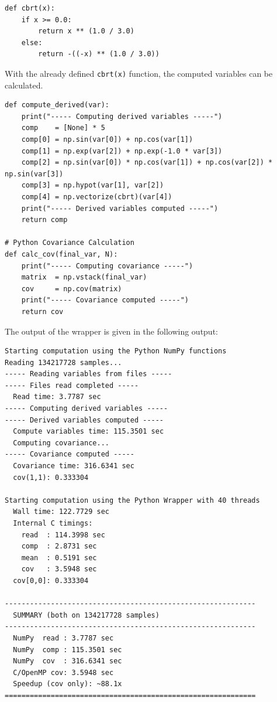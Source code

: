 \begin{verbatim}
def cbrt(x):
    if x >= 0.0:
        return x ** (1.0 / 3.0)
    else:
        return -((-x) ** (1.0 / 3.0))
\end{verbatim}

With the already defined \texttt{cbrt(x)} function, the computed variables can be calculated.

\begin{verbatim}
def compute_derived(var):
    print("----- Computing derived variables -----")
    comp    = [None] * 5
    comp[0] = np.sin(var[0]) + np.cos(var[1])
    comp[1] = np.exp(var[2]) + np.exp(-1.0 * var[3])
    comp[2] = np.sin(var[0]) * np.cos(var[1]) + np.cos(var[2]) * np.sin(var[3])
    comp[3] = np.hypot(var[1], var[2])
    comp[4] = np.vectorize(cbrt)(var[4])
    print("----- Derived variables computed -----")
    return comp

# Python Covariance Calculation
def calc_cov(final_var, N):
    print("----- Computing covariance -----")
    matrix  = np.vstack(final_var)
    cov     = np.cov(matrix)
    print("----- Covariance computed -----")
    return cov
\end{verbatim}

The output of the wrapper is given in the following output:

\begin{verbatim}
Starting computation using the Python NumPy functions
Reading 134217728 samples...
----- Reading variables from files -----
----- Files read completed -----
  Read time: 3.7787 sec
----- Computing derived variables -----
----- Derived variables computed -----
  Compute variables time: 115.3501 sec
  Computing covariance...
----- Covariance computed -----
  Covariance time: 316.6341 sec
  cov(1,1): 0.333304

Starting computation using the Python Wrapper with 40 threads
  Wall time: 122.7729 sec
  Internal C timings:
    read  : 114.3998 sec
    comp  : 2.8731 sec
    mean  : 0.5191 sec
    cov   : 3.5948 sec
  cov[0,0]: 0.333304

------------------------------------------------------------
  SUMMARY (both on 134217728 samples)
------------------------------------------------------------
  NumPy  read : 3.7787 sec
  NumPy  comp : 115.3501 sec
  NumPy  cov  : 316.6341 sec
  C/OpenMP cov: 3.5948 sec
  Speedup (cov only): ~88.1x
============================================================
\end{verbatim}

